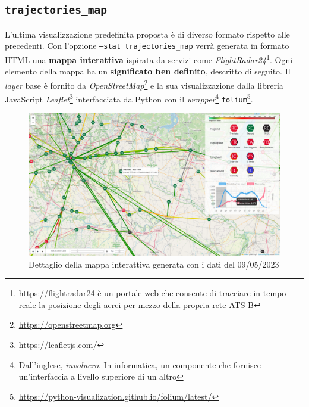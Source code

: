 \documentclass[12pt,a4paper,italian]{report}
\begin{document}
\subsection{\texttt{trajectories\_map}}
\label{stat_trajectories_map}

L'ultima visualizzazione predefinita proposta è di diverso formato
rispetto alle precedenti.  Con l'opzione \texttt{--stat
    trajectories\_\-map} verrà generata in formato HTML una
\textbf{mappa interattiva} ispirata da servizi come
\textit{FlightRadar24}\footnote{\href{https://flightradar24.com}{https://flightradar24}
    è un portale web che consente di tracciare in tempo reale la
    posizione degli aerei per mezzo della propria rete ATS-B}.  Ogni
elemento della mappa ha un \textbf{significato ben definito},
descritto di seguito.  Il \textit{layer} base è fornito da
\textit{OpenStreetMap}\footnote{\href{https://openstreetmap.org}{https://openstreetmap.org}}
e la sua visualizzazione dalla libreria JavaScript
\textit{Leaflet}\footnote{\href{https://leafletjs.com/}{https://leafletjs.com/}}
interfacciata da Python con il \textit{wrapper}\footnote{Dall'inglese,
    \textit{involucro}.  In informatica, un componente che fornisce
    un'interfaccia a livello superiore di un altro}
\texttt{folium}\footnote{\href{https://python-visualization.github.io/folium/latest/}{https://python-visualization.github.io/folium/latest/}}.

\begin{figure} \centering
    \includegraphics[width=1\textwidth]{images/trajectories_map.png}
    \caption{Dettaglio della mappa interattiva generata con i dati del
        09/05/2023}
\end{figure}
\end{document}
